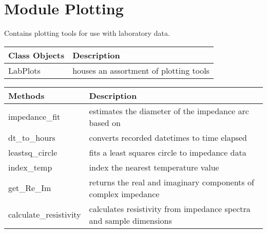 \documentclass[letterpaper,10pt,english]{sphinxmanual}
\begin{document}
\section{Module Plotting}
\label{\detokenize{source/laboratory.utils:module-laboratory.utils.plotting}}\label{\detokenize{source/laboratory.utils:module-plotting}}
Contains plotting tools for use with laboratory data.


\begin{savenotes}\sphinxattablestart
\centering
\begin{tabulary}{\linewidth}[t]{|T|T|}
\hline
\sphinxstyletheadfamily 
Class Objects
&\sphinxstyletheadfamily 
Description
\\
\hline
LabPlots
&
houses an assortment of plotting tools
\\
\hline
\end{tabulary}
\par
\sphinxattableend\end{savenotes}


\begin{savenotes}\sphinxattablestart
\centering
\begin{tabulary}{\linewidth}[t]{|T|T|}
\hline
\sphinxstyletheadfamily 
Methods
&\sphinxstyletheadfamily 
Description
\\
\hline
impedance\_fit
&
estimates the diameter of the impedance arc based on
\\
\hline
dt\_to\_hours
&
converts recorded datetimes to time elapsed
\\
\hline
leastsq\_circle
&
fits a least squares circle to impedance data
\\
\hline
index\_temp
&
index the nearest temperature value
\\
\hline
get\_Re\_Im
&
returns the real and imaginary components of complex impedance
\\
\hline
calculate\_resistivity
&
calculates resistivity from impedance spectra and sample
dimensions
\\
\hline
\end{tabulary}
\par
\sphinxattableend\end{savenotes}
\end{document}
